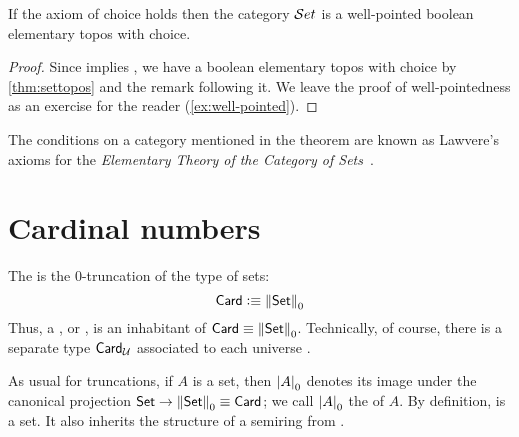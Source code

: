 \begin{thm}\label{thm:ETCS}
  If the axiom of choice holds then the category $\mathcal{S}et$ is a well-pointed boolean elementary topos with choice.  
\end{thm}

\begin{proof}
  Since \choice{} implies \LEM{}, we have a boolean elementary topos with choice by \autoref{thm:settopos} and the remark following it.  We leave the proof of well-pointedness as
an exercise for the reader (\autoref{ex:well-pointed}).
\end{proof}

\begin{rmk}
  The conditions on a category mentioned in the theorem are known as Lawvere's
  axioms for the \emph{Elementary Theory of the Category of Sets}~\cite{lawvere:etcs-long}.
\end{rmk}

\section{Cardinal numbers}
\label{sec:cardinals}

\begin{defn}\label{defn:card}
  The 
  is the 0-truncation of the type \set of sets:
  \[ \mathsf{Card} \vcentcolon\equiv \mathopen{}\left\Vert \mathsf{Set}\right\Vert_{0}\mathclose{} \]
  Thus, a , or , is an inhabitant of $\mathsf{Card}\equiv \mathopen{}\left\Vert \mathsf{Set}\right\Vert_{0}\mathclose{}$.
  Technically, of course, there is a separate type $\mathsf{Card}_\mathcal{U}$ associated to each universe \type.
\end{defn}



As usual for truncations, if $A$ is a set, then $\mathopen{}\left|A\right|_{0}^{}\mathclose{}$ denotes its image under the canonical projection $\mathsf{Set} \to \mathopen{}\left\Vert \mathsf{Set}\right\Vert_{0}\mathclose{} \equiv \mathsf{Card}$; we call $\mathopen{}\left|A\right|_{0}^{}\mathclose{}$ the  of $A$.
By definition, \card is a set.
It also inherits the structure of a semiring from \set.

